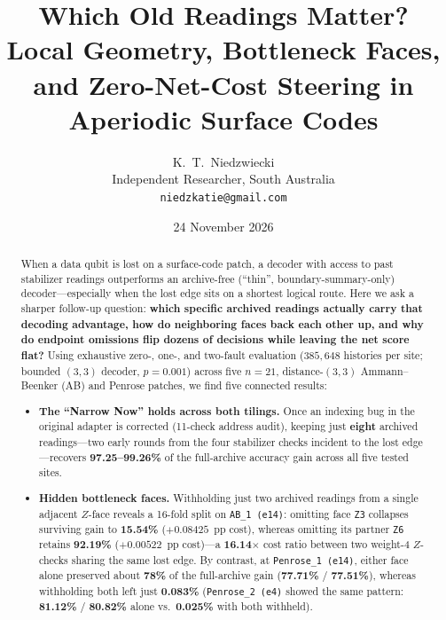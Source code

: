 \documentclass[11pt,a4paper]{article}
\title{\textbf{Which Old Readings Matter?}\\
\large Local Geometry, Bottleneck Faces, and Zero-Net-Cost Steering in Aperiodic Surface Codes}
\author{K.~T.~Niedzwiecki\\
\small Independent Researcher, South Australia\\
\small \texttt{niedzkatie@gmail.com}}
\date{24 November 2026}
\begin{document}
\maketitle

\begin{abstract}
When a data qubit is lost on a surface-code patch, a decoder with access to past stabilizer readings outperforms an archive-free (``thin'', boundary-summary-only) decoder---especially when the lost edge sits on a shortest logical route. Here we ask a sharper follow-up question: \textbf{which specific archived readings actually carry that decoding advantage, how do neighboring faces back each other up, and why do endpoint omissions flip dozens of decisions while leaving the net score flat?} Using exhaustive zero-, one-, and two-fault evaluation ($385{,}648$ histories per site; bounded $(3,3)$ decoder, $p = 0.001$) across five $n=21$, distance-$(3,3)$ Ammann--Beenker (AB) and Penrose patches, we find five connected results:
\begin{itemize}
    \item \textbf{The ``Narrow Now'' holds across both tilings.} Once an indexing bug in the original adapter is corrected (11-check address audit), keeping just \textbf{eight} archived readings---two early rounds from the four stabilizer checks incident to the lost edge---recovers \textbf{97.25--99.26\%} of the full-archive accuracy gain across all five tested sites.
    \item \textbf{Hidden bottleneck faces.} Withholding just two archived readings from a single adjacent $Z$-face reveals a 16-fold split on \texttt{AB\_1 (e14)}: omitting face \texttt{Z3} collapses surviving gain to \textbf{15.54\%} ($+0.08425$~pp cost), whereas omitting its partner \texttt{Z6} retains \textbf{92.19\%} ($+0.00522$~pp cost)---a \textbf{16.14$\times$} cost ratio between two weight-4 $Z$-checks sharing the same lost edge. By contrast, at \texttt{Penrose\_1 (e14)}, either face alone preserved about \textbf{78\%} of the full-archive gain (\textbf{77.71\%} / \textbf{77.51\%}), whereas withholding both left just \textbf{0.083\%} (\texttt{Penrose\_2 (e4)} showed the same pattern: \textbf{81.12\%} / \textbf{80.82\%} alone vs.\ \textbf{0.025\%} with both withheld).

\end{itemize}
\end{abstract}
\end{document}
